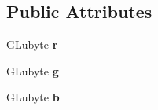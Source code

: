 \subsection*{Public Attributes}
\begin{DoxyCompactItemize}
\item 
\mbox{\label{structColor3B_a18761504d12570de0dc827c0b30b89a9}} 
G\+Lubyte {\bfseries r}
\item 
\mbox{\label{structColor3B_ac7839cd66fd72118687e9de72af15e19}} 
G\+Lubyte {\bfseries g}
\item 
\mbox{\label{structColor3B_a12f6ea75f9aa904084c2c7cdfc1c6650}} 
G\+Lubyte {\bfseries b}
\end{DoxyCompactItemize}
